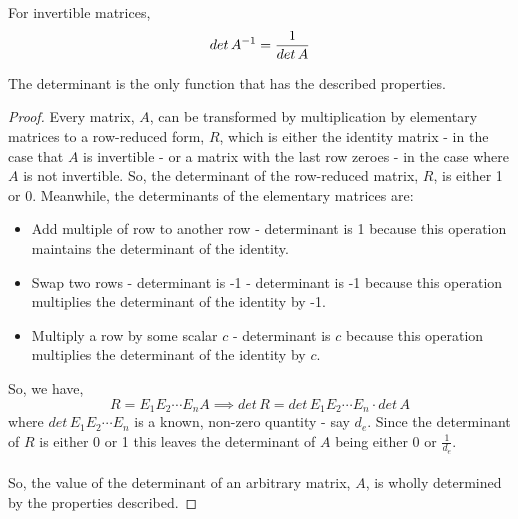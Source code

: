 \documentclass[MathsNotesBase.tex]{subfiles}
\begin{document}
{		\begin{corollary}
			For invertible matrices, \[ det\,{A}^{-1} = \frac{1}{det\,A} \]
		\end{corollary}
	
		\begin{corollary}
			The determinant is the only function that has the described properties.
		\end{corollary}
		\begin{proof}
			Every matrix, $A$, can be transformed by multiplication by elementary matrices to a row-reduced form, $R$, which is either the identity matrix - in the case that $A$ is invertible - or a matrix with the last row zeroes - in the case where $A$ is not invertible. So, the determinant of the row-reduced matrix, $R$, is either 1 or 0. Meanwhile, the determinants of the elementary matrices are:
			\begin{itemize}
				\item{Add multiple of row to another row}  - determinant is 1 because this operation maintains the determinant of the identity.
				\item{Swap two rows - determinant is -1} - determinant is -1 because this operation multiplies the determinant of the identity by -1.
				\item{Multiply a row by some scalar $c$}  - determinant is $c$ because this operation multiplies the determinant of the identity by $c$.
			\end{itemize}
			So, we have,
			\[ R = E_1E_2 \cdots E_nA \implies det\,R = det\,E_1E_2 \cdots E_n \cdot det\,A \]
			where $det\,E_1E_2 \cdots E_n$ is a known, non-zero quantity - say $d_e$. Since the determinant of $R$ is either 0 or 1 this leaves the determinant of $A$ being either 0 or $\frac{1}{d_e}$.
			\paragraph{}So, the value of the determinant of an arbitrary matrix, $A$, is wholly determined by the properties described.
		\end{proof}
	}
\end{document}
